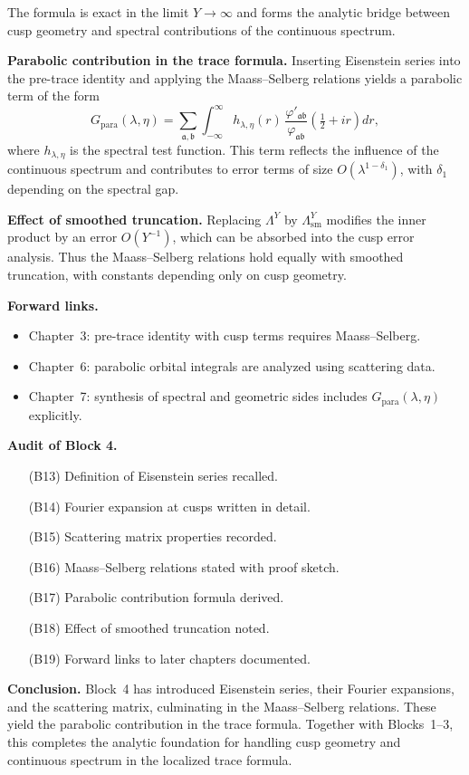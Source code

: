 \begin{remark}
The formula is exact in the limit $Y\to\infty$ and forms the analytic bridge
between cusp geometry and spectral contributions of the continuous spectrum.
\end{remark}

\medskip
\noindent
\textbf{Parabolic contribution in the trace formula.}
Inserting Eisenstein series into the pre-trace identity and applying the
Maass–Selberg relations yields a parabolic term of the form
\[
  G_{\mathrm{para}}(\lambda,\eta)
  = \sum_{\mathfrak{a},\mathfrak{b}}
    \int_{-\infty}^{\infty}
    h_{\lambda,\eta}(r)\,
    \frac{\varphi'_{\mathfrak{a}\mathfrak{b}}}{\varphi_{\mathfrak{a}\mathfrak{b}}}
      \!\left(\tfrac{1}{2}+ir\right) dr,
\]
where $h_{\lambda,\eta}$ is the spectral test function.
This term reflects the influence of the continuous spectrum
and contributes to error terms of size $O(\lambda^{1-\delta_{1}})$,
with $\delta_{1}$ depending on the spectral gap.

\medskip
\noindent
\textbf{Effect of smoothed truncation.}
Replacing $\Lambda^{Y}$ by $\Lambda^{Y}_{\mathrm{sm}}$ modifies the inner product
by an error $O(Y^{-1})$,
which can be absorbed into the cusp error analysis.
Thus the Maass–Selberg relations hold equally with smoothed truncation,
with constants depending only on cusp geometry.

\medskip
\noindent
\textbf{Forward links.}
\begin{itemize}
  \item Chapter~3: pre-trace identity with cusp terms requires Maass–Selberg.
  \item Chapter~6: parabolic orbital integrals are analyzed using scattering data.
  \item Chapter~7: synthesis of spectral and geometric sides includes
        $G_{\mathrm{para}}(\lambda,\eta)$ explicitly.
\end{itemize}

\medskip
\noindent
\textbf{Audit of Block 4.}
\begin{itemize}
  \item[(B13)] Definition of Eisenstein series recalled.
  \item[(B14)] Fourier expansion at cusps written in detail.
  \item[(B15)] Scattering matrix properties recorded.
  \item[(B16)] Maass–Selberg relations stated with proof sketch.
  \item[(B17)] Parabolic contribution formula derived.
  \item[(B18)] Effect of smoothed truncation noted.
  \item[(B19)] Forward links to later chapters documented.
\end{itemize}

\medskip
\noindent
\textbf{Conclusion.}
Block~4 has introduced Eisenstein series, their Fourier expansions,
and the scattering matrix, culminating in the Maass–Selberg relations.
These yield the parabolic contribution in the trace formula.
Together with Blocks~1–3,
this completes the analytic foundation for handling cusp geometry
and continuous spectrum in the localized trace formula.
